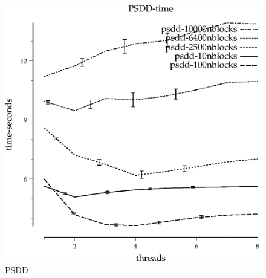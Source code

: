 \documentclass{article}
\begin{document}
\begin{figure}
\begin{center}
\includegraphics{PSDD-time}
\end{center}
\caption{PSDD}
\end{figure}
\end{document}
